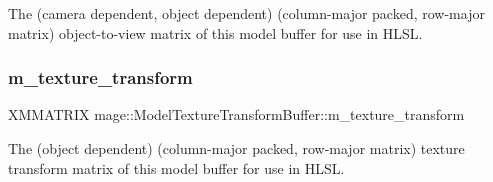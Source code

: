 The (camera dependent, object dependent) (column-\/major packed, row-\/major matrix) object-\/to-\/view matrix of this model buffer for use in H\+L\+SL. \hypertarget{structmage_1_1_model_texture_transform_buffer_aec121458581c6508c8caaab65b073b73}{}\label{structmage_1_1_model_texture_transform_buffer_aec121458581c6508c8caaab65b073b73} 
\subsubsection{\texorpdfstring{m\+\_\+texture\+\_\+transform}{m\_texture\_transform}}
{\footnotesize\ttfamily X\+M\+M\+A\+T\+R\+IX mage\+::\+Model\+Texture\+Transform\+Buffer\+::m\+\_\+texture\+\_\+transform}

The (object dependent) (column-\/major packed, row-\/major matrix) texture transform matrix of this model buffer for use in H\+L\+SL. 